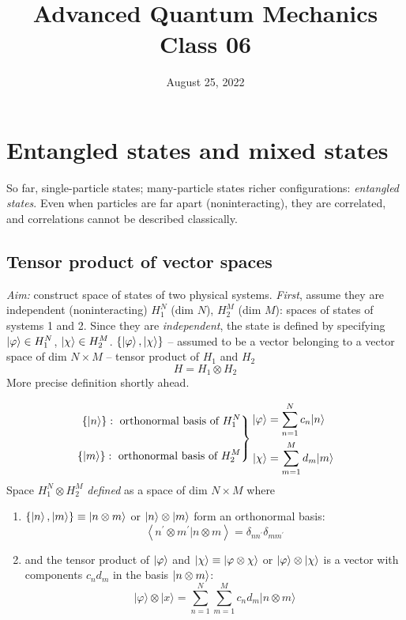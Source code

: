 \documentclass[12pt]{article}
\title{Advanced Quantum Mechanics\\Class 06}
\date{August 25, 2022}                                           %
\newcommand{\be}{\begin{equation}}
\newcommand{\ee}{\end{equation}}
\begin{document}
\maketitle


\section{Entangled states and mixed states}

So far, single-particle states; many-particle states
richer configurations: \emph{entangled states}.
Even when particles are far apart (noninteracting),
they are correlated, and correlations cannot be
described classically.

\subsection{Tensor product of vector spaces}

\emph{Aim:} construct space of states of two physical systems.
\emph{First}, assume they are independent (noninteracting)
$H_1^N$ (dim $N$), $H_2^M$ (dim $M$): spaces of states of systems 1 and 2.
Since they are \emph{independent}, the state is defined by
specifying $\ket{\varphi} \in H_1^N$, $\ket{\chi} \in H_2^M$.
$\{
\ket{\varphi}, \ket{\chi}
\}$ -- assumed to be a vector belonging to
a vector space of dim $N \times M$ --
tensor product of $H_1$ and $H_2$
\be
H = H_1 \otimes H_2
\ee
More precise definition shortly ahead.


\be
\left.
\begin{aligned}
\{\ket{n}\}: \text{ orthonormal basis of } H_1^N\\
\\
\{\ket{m}\}: \text{ orthonormal basis of } H_2^M
\end{aligned}
\right\}
\begin{aligned}
|\varphi\rangle&=\sum_{n=1}^{N} c_{n}|n\rangle\\
|\chi   \rangle&=\sum_{m=1}^{M} d_{m}|m\rangle\\
\end{aligned}
\ee
Space $H_1^N \otimes H_2^M$ \emph{defined} as a space of dim $N \times M$ where
\begin{enumerate}
\item $\{\ket{n}, \ket{m}\} \equiv \ket{n\otimes m}$ or $\ket{n}\otimes \ket{m}$ form an
orthonormal basis:
\be
\left\langle n^{\prime} \otimes m^{\prime} | n \otimes m\right\rangle=
\delta_{n n^{\prime}}
\delta_{m m^{\prime}}
\ee
%
\item and the tensor product of $\ket{\varphi}$ and $\ket{\chi} \equiv \ket{\varphi \otimes \chi}$
or $\ket{\varphi} \otimes \ket{\chi}$ is a vector with components $c_n d_m$
in the basis $\ket{n \otimes m}$:
\be
|\varphi\rangle \otimes|x\rangle=\sum_{n=1}^{N} \sum_{m=1}^{M} c_{n} d_{m}|n \otimes m\rangle
\ee
\end{enumerate}
\end{document}

